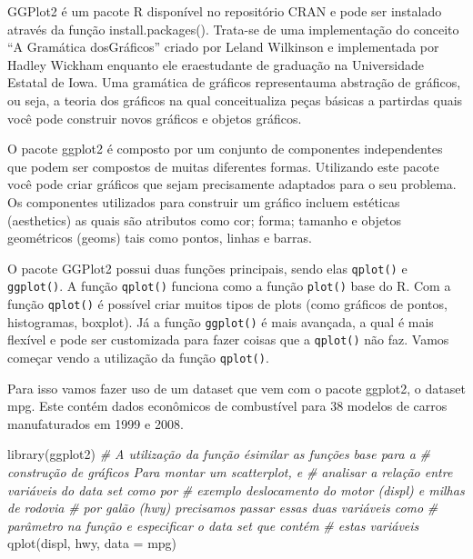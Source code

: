 \documentclass[
]{book}
\newenvironment{Shaded}{\begin{snugshade}}{\end{snugshade}}
\newcommand{\AttributeTok}[1]{\textcolor[rgb]{0.77,0.63,0.00}{#1}}
\newcommand{\CommentTok}[1]{\textcolor[rgb]{0.56,0.35,0.01}{\textit{#1}}}
\newcommand{\FunctionTok}[1]{\textcolor[rgb]{0.00,0.00,0.00}{#1}}
\newcommand{\NormalTok}[1]{#1}
\begin{document}
GGPlot2 é um pacote R disponível no repositório CRAN e pode ser instalado através da função install.packages(). Trata-se de uma implementação do conceito ``A Gramática dosGráficos'' criado por Leland Wilkinson e implementada por Hadley Wickham enquanto ele eraestudante de graduação na Universidade Estatal de Iowa. Uma gramática de gráficos representauma abstração de gráficos, ou seja, a teoria dos gráficos na qual conceitualiza peças básicas a partirdas quais você pode construir novos gráficos e objetos gráficos.

O pacote ggplot2 é composto por um conjunto de componentes independentes que podem
ser compostos de muitas diferentes formas. Utilizando este pacote você pode criar gráficos que sejam precisamente adaptados para o seu problema. Os componentes utilizados para construir um gráfico incluem estéticas (aesthetics) as quais são atributos como cor; forma; tamanho e objetos geométricos (geoms) tais como pontos, linhas e barras.

O pacote GGPlot2 possui duas funções principais, sendo elas \texttt{qplot()} e \texttt{ggplot()}. A função \texttt{qplot()} funciona como a função \texttt{plot()} base do R. Com a função \texttt{qplot()} é possível criar muitos tipos de plots (como gráficos de pontos, histogramas, boxplot). Já a função \texttt{ggplot()} é mais avançada, a qual é mais flexível e pode ser customizada para fazer coisas que a \texttt{qplot()} não faz. Vamos começar vendo a utilização da função \texttt{qplot()}.

Para isso vamos fazer uso de um dataset que vem com o pacote ggplot2, o dataset mpg. Este contém dados econômicos de combustível para 38 modelos de carros manufaturados em 1999 e 2008.

\begin{Shaded}
\begin{Highlighting}[]
\FunctionTok{library}\NormalTok{(ggplot2)}
\CommentTok{\# A utilização da função ésimilar as funções base para a}
\CommentTok{\# construção de gráficos Para montar um scatterplot, e}
\CommentTok{\# analisar a relação entre variáveis do data set como por}
\CommentTok{\# exemplo deslocamento do motor (displ) e milhas de rodovia}
\CommentTok{\# por galão (hwy) precisamos passar essas duas variáveis como}
\CommentTok{\# parâmetro na função e especificar o data set que contém}
\CommentTok{\# estas variáveis}
\FunctionTok{qplot}\NormalTok{(displ, hwy, }\AttributeTok{data =}\NormalTok{ mpg)}
\end{Highlighting}
\end{Shaded}
\end{document}
